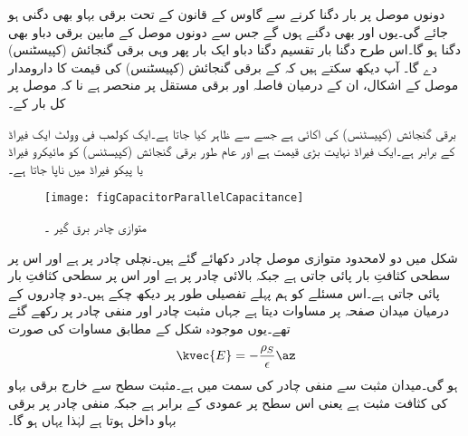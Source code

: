 دونوں موصل پر بار دگنا کرنے سے گاوس کے قانون کے تحت برقی بہاو بھی دگنی ہو جائے گی۔یوں  اور  بھی دگنے ہوں گے جس سے دونوں موصل کے مابین برقی دباو بھی دگنا ہو گا۔اس طرح دگنا بار تقسیم دگنا دباو ایک بار پھر وہی برقی گنجائش (کپیسٹنس) دے گا۔ آپ دیکھ سکتے ہیں کہ  کے  برقی گنجائش (کپیسٹنس) کی قیمت کا دارومدار موصل کے اشکال، ان کے درمیان فاصلہ اور برقی مستقل پر منحصر ہے نا کہ موصل پر کل بار کے۔

برقی گنجائش (کپیسٹنس) کی اکائی  ہے جسے  سے ظاہر کیا جاتا ہے۔ایک کولمب فی وولٹ ایک فیراڈ کے برابر ہے۔ایک فیراڈ نہایت بڑی قیمت ہے اور عام طور برقی گنجائش (کپیسٹنس) کو مائیکرو فیراڈ  یا پیکو فیراڈ  میں ناپا جاتا ہے۔

\begin{figure}
\centering
\texttt{[image: figCapacitorParallelCapacitance]}
\caption{متوازی چادر برق گیر ۔}
\label{شکل_کپیسٹر_متوازی_چادر_کپیسٹر}
\end{figure}

شکل  میں دو لامحدود متوازی موصل چادر دکھائے گئے ہیں۔نچلی چادر   پر ہے اور اس پر سطحی کثافتِ بار  پائی جاتی ہے جبکہ بالائی چادر  پر ہے اور اس پر سطحی کثافتِ بار  پائی جاتی ہے۔اس مسئلے کو ہم پہلے تفصیلی طور پر دیکھ چکے ہیں۔دو چادروں کے درمیان میدان صفحہ  پر مساوات  دیتا ہے جہاں مثبت
 چادر  اور منفی چادر  پر رکھے گئے تھے۔یوں موجودہ شکل کے مطابق مساوات  کی صورت
\begin{align*}
\kvec{E}=-\frac{\rho_S}{\epsilon} \az
\end{align*}
ہو گی۔میدان مثبت سے منفی چادر کی سمت میں ہے۔مثبت سطح سے خارج برقی بہاو کی کثافت مثبت ہے یعنی اس سطح پر عمودی  کے برابر ہے جبکہ منفی چادر پر برقی بہاو داخل ہوتا ہے لہٰذا یہاں  ہو گا۔

